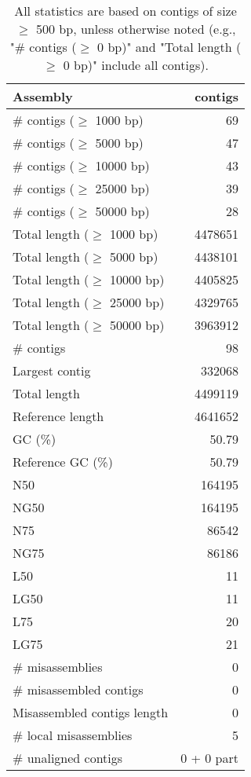 \documentclass[12pt,a4paper]{article}
\begin{document}
\begin{table}[ht]
\begin{center}
\caption{All statistics are based on contigs of size $\geq$ 500 bp, unless otherwise noted (e.g., "\# contigs ($\geq$ 0 bp)" and "Total length ($\geq$ 0 bp)" include all contigs).}
\begin{tabular}{|l*{1}{|r}|}
\hline
Assembly & contigs \\ \hline
\# contigs ($\geq$ 1000 bp) & 69 \\ \hline
\# contigs ($\geq$ 5000 bp) & 47 \\ \hline
\# contigs ($\geq$ 10000 bp) & 43 \\ \hline
\# contigs ($\geq$ 25000 bp) & 39 \\ \hline
\# contigs ($\geq$ 50000 bp) & 28 \\ \hline
Total length ($\geq$ 1000 bp) & 4478651 \\ \hline
Total length ($\geq$ 5000 bp) & 4438101 \\ \hline
Total length ($\geq$ 10000 bp) & 4405825 \\ \hline
Total length ($\geq$ 25000 bp) & 4329765 \\ \hline
Total length ($\geq$ 50000 bp) & 3963912 \\ \hline
\# contigs & 98 \\ \hline
Largest contig & 332068 \\ \hline
Total length & 4499119 \\ \hline
Reference length & 4641652 \\ \hline
GC (\%) & 50.79 \\ \hline
Reference GC (\%) & 50.79 \\ \hline
N50 & 164195 \\ \hline
NG50 & 164195 \\ \hline
N75 & 86542 \\ \hline
NG75 & 86186 \\ \hline
L50 & 11 \\ \hline
LG50 & 11 \\ \hline
L75 & 20 \\ \hline
LG75 & 21 \\ \hline
\# misassemblies & 0 \\ \hline
\# misassembled contigs & 0 \\ \hline
Misassembled contigs length & 0 \\ \hline
\# local misassemblies & 5 \\ \hline
\# unaligned contigs & 0 + 0 part \\ \hline

\end{tabular}
\end{center}
\end{table}
\end{document}
